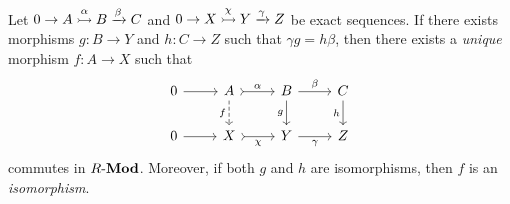 \begin{proposition}
\label{prop:unique-isomorphism-exact-sequences-left}
Let \(0 \to A \overset{\alpha}{\rightarrowtail} B \xrightarrow \beta C\) and
\(0 \to X \overset{\chi}{\rightarrowtail} Y \xrightarrow \gamma Z\) be exact sequences. If
there exists morphisms \(g: B \to Y\) and \(h: C \to Z\) such that
\(\gamma g =h \beta\), then there exists a \emph{unique} morphism \(f: A \to X\)
such that
\[
\begin{tikzcd}
0 \ar[r]
&A \ar[r, tail, "\alpha"] \ar[d, dashed, "f"']
&B \ar[r, "\beta"] \ar[d, "g"']
&C \ar[d, "h"']
\\
0 \ar[r]
&X \ar[r, tail, "\chi"']
&Y \ar[r, "\gamma"']
&Z
\end{tikzcd}
\]
commutes in \({R\text{-}\textbf{Mod}}\). Moreover, if both \(g\) and \(h\) are isomorphisms,
then \(f\) is an \emph{isomorphism}.
\end{proposition}

